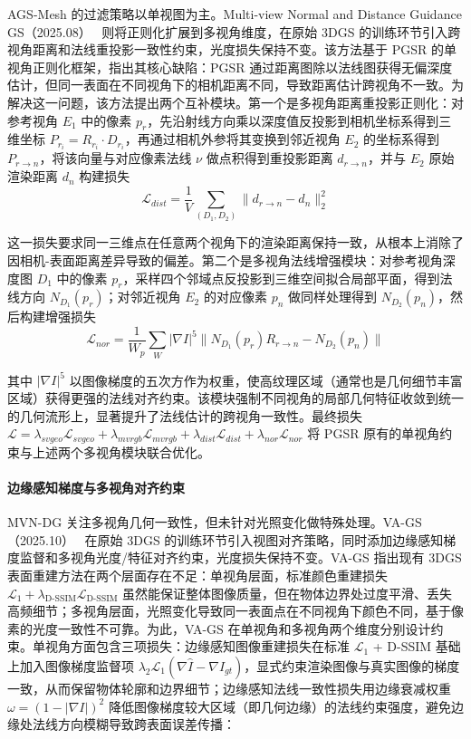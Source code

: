 AGS-Mesh 的过滤策略以单视图为主。Multi-view Normal and Distance Guidance GS（2025.08）~\cite{2508_07701} 则将正则化扩展到多视角维度，在原始 3DGS 的训练环节引入跨视角距离和法线重投影一致性约束，光度损失保持不变。该方法基于 PGSR 的单视角正则化框架，指出其核心缺陷：PGSR 通过距离图除以法线图获得无偏深度估计，但同一表面在不同视角下的相机距离不同，导致距离估计跨视角不一致。为解决这一问题，该方法提出两个互补模块。第一个是多视角距离重投影正则化：对参考视角 $E_1$ 中的像素 $p_r$，先沿射线方向乘以深度值反投影到相机坐标系得到三维坐标 $P_{r_i} = R_{r_i} \cdot D_{r_i}$，再通过相机外参将其变换到邻近视角 $E_2$ 的坐标系得到 $P_{r \to n}$，将该向量与对应像素法线 $\nu$ 做点积得到重投影距离 $d_{r \to n}$，并与 $E_2$ 原始渲染距离 $d_n$ 构建损失
\begin{equation}
\mathcal{L}_{dist} = \frac{1}{V} \sum_{(D_1, D_2)} \| d_{r \to n} - d_n \|_2^2
\end{equation}

这一损失要求同一三维点在任意两个视角下的渲染距离保持一致，从根本上消除了因相机-表面距离差异导致的偏差。第二个是多视角法线增强模块：对参考视角深度图 $D_1$ 中的像素 $p_r$，采样四个邻域点反投影到三维空间拟合局部平面，得到法线方向 $N_{D_1}(p_r)$；对邻近视角 $E_2$ 的对应像素 $p_n$ 做同样处理得到 $N_{D_2}(p_n)$，然后构建增强损失
\begin{equation}
\mathcal{L}_{nor} = \frac{1}{W_p} \sum_W | \nabla I |^5 \| N_{D_1}(p_r) R_{r \to n} - N_{D_2}(p_n) \|
\end{equation}

其中 $|\nabla I|^5$ 以图像梯度的五次方作为权重，使高纹理区域（通常也是几何细节丰富区域）获得更强的法线对齐约束。该模块强制不同视角的局部几何特征收敛到统一的几何流形上，显著提升了法线估计的跨视角一致性。最终损失 $\mathcal{L} = \lambda_{svgeo}\mathcal{L}_{svgeo} + \lambda_{mvrgb}\mathcal{L}_{mvrgb} + \lambda_{dist}\mathcal{L}_{dist} + \lambda_{nor}\mathcal{L}_{nor}$ 将 PGSR 原有的单视角约束与上述两个多视角模块联合优化。

\paragraph{边缘感知梯度与多视角对齐约束}

MVN-DG 关注多视角几何一致性，但未针对光照变化做特殊处理。VA-GS（2025.10）~\cite{2510_11473} 在原始 3DGS 的训练环节引入视图对齐策略，同时添加边缘感知梯度监督和多视角光度/特征对齐约束，光度损失保持不变。VA-GS 指出现有 3DGS 表面重建方法在两个层面存在不足：单视角层面，标准颜色重建损失 $\mathcal{L}_1 + \lambda_{\text{D-SSIM}}\mathcal{L}_{\text{D-SSIM}}$ 虽然能保证整体图像质量，但在物体边界处过度平滑、丢失高频细节；多视角层面，光照变化导致同一表面点在不同视角下颜色不同，基于像素的光度一致性不可靠。为此，VA-GS 在单视角和多视角两个维度分别设计约束。单视角方面包含三项损失：边缘感知图像重建损失在标准 $\mathcal{L}_1$ + D-SSIM 基础上加入图像梯度监督项 $\lambda_2 \mathcal{L}_1(\nabla \hat{I} - \nabla I_{gt})$，显式约束渲染图像与真实图像的梯度一致，从而保留物体轮廓和边界细节；边缘感知法线一致性损失用边缘衰减权重 $\omega = (1 - |\nabla I|)^2$ 降低图像梯度较大区域（即几何边缘）的法线约束强度，避免边缘处法线方向模糊导致跨表面误差传播：

